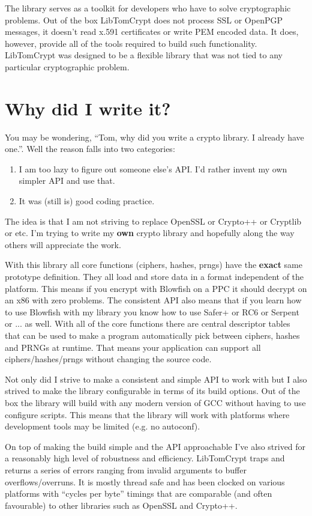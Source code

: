 \documentclass[a4paper]{book}
\begin{document}
The library serves as a toolkit for developers who have to solve cryptographic problems.  Out of the box LibTomCrypt
does not process SSL or OpenPGP messages, it doesn't read x.591 certificates or write PEM encoded data.  It does, however,
provide all of the tools required to build such functionality.  LibTomCrypt was designed to be a flexible library that 
was not tied to any particular cryptographic problem.  

\section{Why did I write it?}
You may be wondering, ``Tom, why did you write a crypto library.  I already have one.''.  Well the reason falls into
two categories:
\begin{enumerate}
    \item I am too lazy to figure out someone else's API.  I'd rather invent my own simpler API and use that.
    \item It was (still is) good coding practice.
\end{enumerate}

The idea is that I am not striving to replace OpenSSL or Crypto++ or Cryptlib or etc.  I'm trying to write my 
{\bf own} crypto library and hopefully along the way others will appreciate the work.

With this library all core functions (ciphers, hashes, prngs) have the {\bf exact} same prototype definition.  They all load
and store data in a format independent of the platform.  This means if you encrypt with Blowfish on a PPC it should decrypt
on an x86 with zero problems.  The consistent API also means that if you learn how to use Blowfish with my library you 
know how to use Safer+ or RC6 or Serpent or ... as well.  With all of the core functions there are central descriptor tables 
that can be used to make a program automatically pick between ciphers, hashes and PRNGs at runtime.  That means your 
application can support all ciphers/hashes/prngs without changing the source code.

Not only did I strive to make a consistent and simple API to work with but I also strived to make the library
configurable in terms of its build options.  Out of the box the library will build with any modern version of GCC
without having to use configure scripts.  This means that the library will work with platforms where development
tools may be limited (e.g. no autoconf).

On top of making the build simple and the API approachable I've also strived for a reasonably high level of
robustness and efficiency.  LibTomCrypt traps and returns a series of errors ranging from invalid
arguments to buffer overflows/overruns.  It is mostly thread safe and has been clocked on various platforms
with ``cycles per byte'' timings that are comparable (and often favourable) to other libraries such as OpenSSL and
Crypto++.
\end{document}
